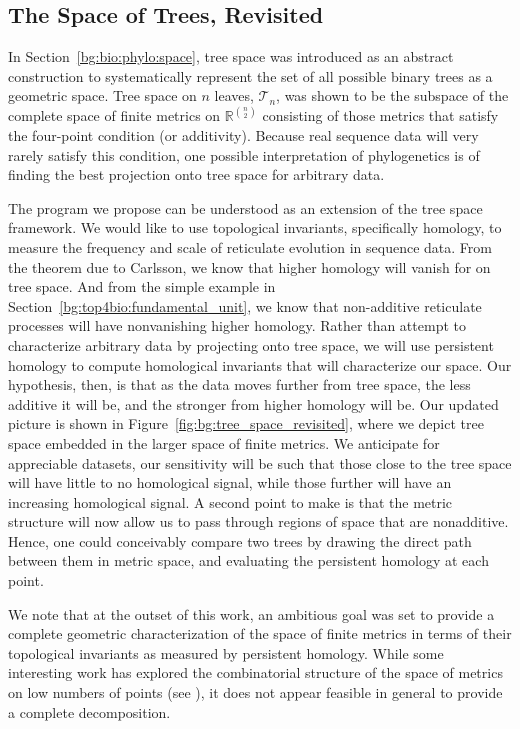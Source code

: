 \subsection{The Space of Trees, Revisited}
\label{bg:top4bio:tree_space}

In Section~\ref{bg:bio:phylo:space}, tree space was introduced as an abstract construction to systematically represent the set of all possible binary trees as a geometric space.
Tree space on $n$ leaves, $\mathcal{T}_n$, was shown to be the subspace of the complete space of finite metrics on $\mathbb{R}^{\binom{n}{2}}$ consisting of those metrics that satisfy the four-point condition (or additivity).
Because real sequence data will very rarely satisfy this condition, one possible interpretation of phylogenetics is of finding the best projection onto tree space for arbitrary data.

The program we propose can be understood as an extension of the tree space framework.
We would like to use topological invariants, specifically homology, to measure the frequency and scale of reticulate evolution in sequence data.
From the theorem due to Carlsson, we know that higher homology will vanish for on tree space.
And from the simple example in Section~\ref{bg:top4bio:fundamental_unit}, we know that non-additive reticulate processes will have nonvanishing higher homology.
Rather than attempt to characterize arbitrary data by projecting onto tree space, we will use persistent homology to compute homological invariants that will characterize our space.
Our hypothesis, then, is that as the data moves further from tree space, the less additive it will be, and the stronger from higher homology will be.
Our updated picture is shown in Figure~\ref{fig:bg:tree_space_revisited}, where we depict tree space embedded in the larger space of finite metrics.
We anticipate for appreciable datasets, our sensitivity will be such that those close to the tree space will have little to no homological signal, while those further will have an increasing homological signal.
A second point to make is that the metric structure will now allow us to pass through regions of space that are nonadditive.
Hence, one could conceivably compare two trees by drawing the direct path between them in metric space, and evaluating the persistent homology at each point.

We note that at the outset of this work, an ambitious goal was set to provide a complete geometric characterization of the space of finite metrics in terms of their topological invariants as measured by persistent homology.
While some interesting work has explored the combinatorial structure of the space of metrics on low numbers of points (see \cite{Sturmfels:2004vc}), it does not appear feasible in general to provide a complete decomposition.

